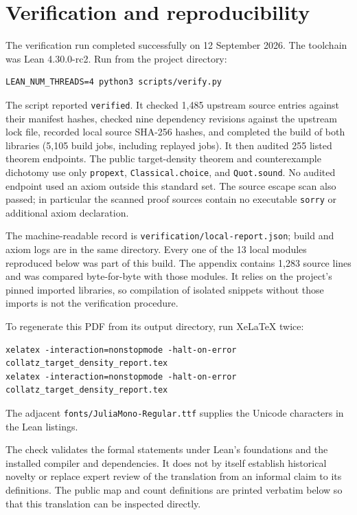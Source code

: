 \documentclass[11pt]{article}
\begin{document}
\section{Verification and reproducibility}
The verification run completed successfully on 12 September 2026.
The toolchain was Lean 4.30.0-rc2. Run from the project directory:
\begin{Verbatim}[breaklines=true]
LEAN_NUM_THREADS=4 python3 scripts/verify.py
\end{Verbatim}
The script reported \texttt{verified}. It checked 1,485 upstream source
entries against their manifest hashes, checked nine dependency revisions
against the upstream lock file, recorded local source SHA-256 hashes,
and completed the build of both libraries (5,105 build jobs, including
replayed jobs). It then audited 255 listed theorem endpoints. The public
target-density theorem and counterexample dichotomy use only
\texttt{propext}, \texttt{Classical.choice}, and \texttt{Quot.sound}.
No audited endpoint used an axiom outside this standard set. The source
escape scan also passed; in particular the scanned proof sources contain
no executable \texttt{sorry} or additional axiom declaration.

The machine-readable record is \texttt{verification/local-report.json};
build and axiom logs are in the same directory. Every one of the 13 local
modules reproduced below was part of this build. The appendix contains
1,283 source lines and was compared byte-for-byte with those modules.
It relies on the project's pinned imported libraries, so compilation of
isolated snippets without those imports is not the verification procedure.

To regenerate this PDF from its output directory, run XeLaTeX twice:
\begin{Verbatim}[breaklines=true]
xelatex -interaction=nonstopmode -halt-on-error collatz_target_density_report.tex
xelatex -interaction=nonstopmode -halt-on-error collatz_target_density_report.tex
\end{Verbatim}
The adjacent \texttt{fonts/JuliaMono-Regular.ttf} supplies the Unicode
characters in the Lean listings.

The check validates the formal statements under Lean's foundations and
the installed compiler and dependencies. It does not by itself establish
historical novelty or replace expert review of the translation from an
informal claim to its definitions. The public map and count definitions are
printed verbatim below so that this translation can be inspected directly.
\end{document}
